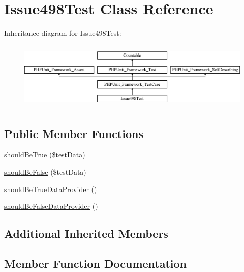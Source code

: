 \hypertarget{class_issue498_test}{}\section{Issue498\+Test Class Reference}
\label{class_issue498_test}
Inheritance diagram for Issue498\+Test\+:\begin{figure}[H]
\begin{center}
\leavevmode
\includegraphics[height=3.303835cm]{class_issue498_test}
\end{center}
\end{figure}
\subsection*{Public Member Functions}
\begin{DoxyCompactItemize}
\item 
\mbox{\hyperlink{class_issue498_test_ae2d9793ead272ba13bf1665e98120e45}{should\+Be\+True}} (\$test\+Data)
\item 
\mbox{\hyperlink{class_issue498_test_a814b69db82d05f44d8a285efe1f70390}{should\+Be\+False}} (\$test\+Data)
\item 
\mbox{\hyperlink{class_issue498_test_a7f206983c74527e7a74c15464be42690}{should\+Be\+True\+Data\+Provider}} ()
\item 
\mbox{\hyperlink{class_issue498_test_a6ec2329c630e61a5b52beb0973e261b4}{should\+Be\+False\+Data\+Provider}} ()
\end{DoxyCompactItemize}
\subsection*{Additional Inherited Members}


\subsection{Member Function Documentation}
\mbox{\label{class_issue498_test_a814b69db82d05f44d8a285efe1f70390}} 

